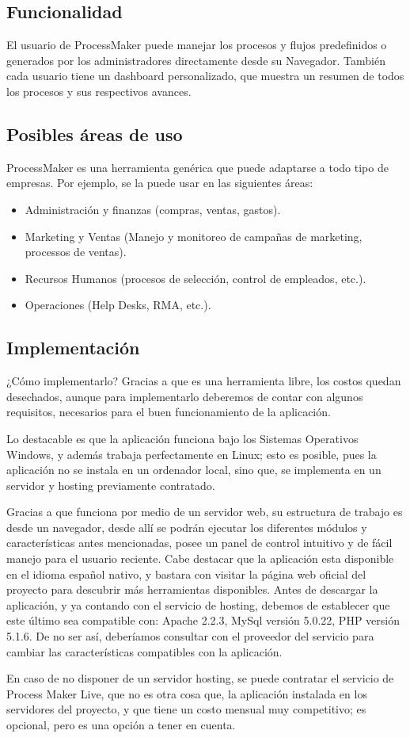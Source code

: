 \subsection{Funcionalidad}
El usuario de ProcessMaker puede manejar los procesos y flujos predefinidos o generados por los administradores directamente desde su Navegador. También cada usuario tiene un dashboard personalizado, que muestra un resumen de todos los procesos y sus respectivos avances.

\subsection{Posibles áreas de uso}
ProcessMaker es una herramienta genérica que puede adaptarse a todo tipo de empresas. Por ejemplo, se la puede usar en las siguientes áreas:
\begin{itemize}
\item Administración y finanzas (compras, ventas, gastos).
\item Marketing y Ventas (Manejo y monitoreo de campañas de marketing, processos de ventas).
\item Recursos Humanos (procesos de selección, control de empleados, etc.).
\item Operaciones (Help Desks, RMA, etc.).
\end{itemize}

\subsection{Implementación}

¿Cómo implementarlo? Gracias a que es una herramienta libre, los costos quedan desechados, aunque para implementarlo deberemos de contar con algunos requisitos, necesarios para el buen funcionamiento de la aplicación.

Lo destacable es que la aplicación funciona bajo los Sistemas Operativos Windows, y además trabaja perfectamente en Linux; esto es posible, pues la aplicación no se instala en un ordenador local, sino que, se implementa en un servidor y hosting previamente contratado.

Gracias a que funciona por medio de un servidor web, su estructura de trabajo es desde un navegador, desde allí se podrán ejecutar los diferentes módulos y características antes mencionadas, posee un panel de control intuitivo y de fácil manejo para el usuario reciente. Cabe destacar que la aplicación esta disponible en el idioma español nativo, y bastara con visitar la página web oficial del proyecto para descubrir más herramientas disponibles.
Antes de descargar la aplicación, y ya contando con el servicio de hosting, debemos de establecer que este último sea compatible con: Apache 2.2.3, MySql versión 5.0.22, PHP versión 5.1.6. De no ser así, deberíamos consultar con el proveedor del servicio para cambiar las características compatibles con la aplicación.

En caso de no disponer de un servidor hosting, se puede contratar el servicio de Process Maker Live, que no es otra cosa que, la aplicación instalada en los servidores del proyecto, y que tiene un costo mensual muy competitivo; es opcional, pero es una opción a tener en cuenta.







